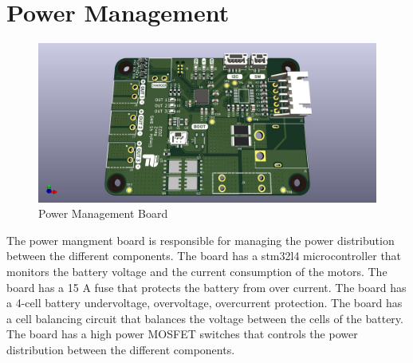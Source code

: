 \section{Power Management}
\begin{figure}[h]
	\centering
	\includegraphics[width=1\linewidth]{Power_Management_Board}
	\caption[ Power Management Board ]{Power Management Board}
	\label{fig:powermanagementboard}
\end{figure}

The power mangment board is responsible for managing the power distribution between the different components. The board has a stm32l4 microcontroller that monitors the battery voltage and the current consumption of the motors. The board has a 15 A fuse that protects the battery from over current. The board has a 4-cell battery undervoltage, overvoltage, overcurrent protection. The board has a cell balancing circuit that balances the voltage between the cells of the battery. The board has a high power MOSFET switches that controls the power distribution between the different components.

